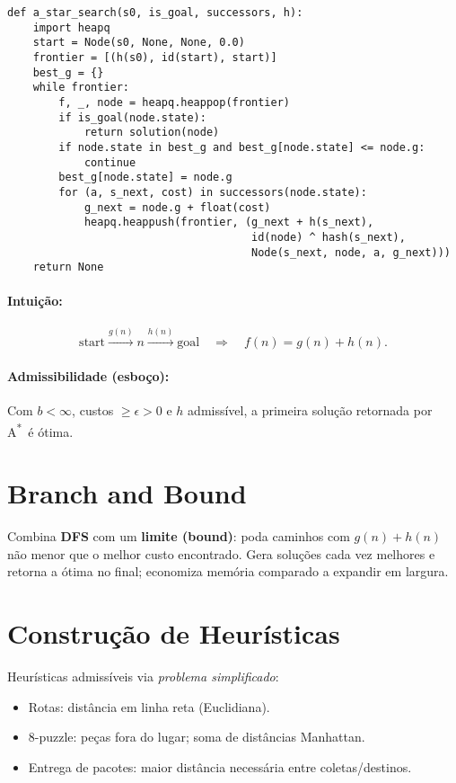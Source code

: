 \documentclass[9pt,a4paper]{extarticle}
\newcommand{\Astar}{A\textsuperscript{*}}
\begin{document}
\begin{lstlisting}
def a_star_search(s0, is_goal, successors, h):
    import heapq
    start = Node(s0, None, None, 0.0)
    frontier = [(h(s0), id(start), start)]
    best_g = {}
    while frontier:
        f, _, node = heapq.heappop(frontier)
        if is_goal(node.state):
            return solution(node)
        if node.state in best_g and best_g[node.state] <= node.g:
            continue
        best_g[node.state] = node.g
        for (a, s_next, cost) in successors(node.state):
            g_next = node.g + float(cost)
            heapq.heappush(frontier, (g_next + h(s_next),
                                      id(node) ^ hash(s_next),
                                      Node(s_next, node, a, g_next)))
    return None
\end{lstlisting}

\paragraph{Intuição:}
\[
\text{start} \xrightarrow{g(n)} n \xrightarrow{h(n)} \text{goal}
\quad \Rightarrow \quad f(n) = g(n) + h(n).
\]

\paragraph{Admissibilidade (esboço):}
Com $b<\infty$, custos $\ge \epsilon>0$ e $h$ admissível, a primeira solução retornada por \Astar\ é ótima.

\section{Branch and Bound}

Combina \textbf{DFS} com um \textbf{limite (bound)}: poda caminhos com $g(n)+h(n)$ não menor que o melhor custo encontrado.
Gera soluções cada vez melhores e retorna a ótima no final; economiza memória comparado a expandir em largura.

\section{Construção de Heurísticas}

Heurísticas admissíveis via \emph{problema simplificado}:
\begin{itemize}
  \item Rotas: distância em linha reta (Euclidiana).
  \item 8-puzzle: peças fora do lugar; soma de distâncias Manhattan.
  \item Entrega de pacotes: maior distância necessária entre coletas/destinos.
\end{itemize}
\end{document}
